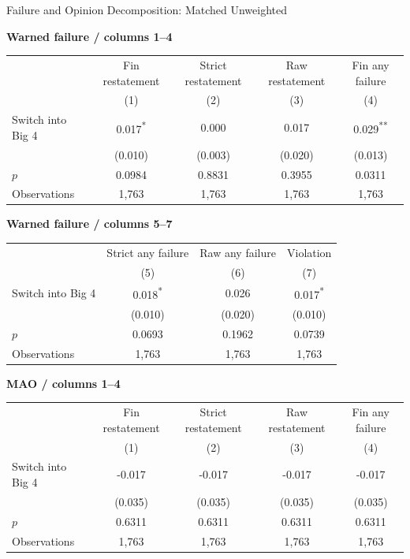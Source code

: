 \documentclass[10pt]{article}
\newcommand{\sym}[1]{\textsuperscript{#1}}
\begin{document}
\fontsize{10}{12}\selectfont
\setlength{\tabcolsep}{3pt}\renewcommand{\arraystretch}{1.15}
\begin{center}\large Failure and Opinion Decomposition: Matched Unweighted\end{center}
\medskip\textbf{Warned failure / columns 1--4}\par\smallskip
\begin{tabular*}{\textwidth}{@{\extracolsep{\fill}}lcccc@{}}
\toprule
 & Fin restatement & Strict restatement & Raw restatement & Fin any failure \\
 & (1) & (2) & (3) & (4) \\
\midrule
Switch into Big 4 & 0.017\sym{*} & 0.000 & 0.017 & 0.029\sym{**} \\
 & (0.010) & (0.003) & (0.020) & (0.013) \\
$p$ & 0.0984 & 0.8831 & 0.3955 & 0.0311 \\
Observations & 1,763 & 1,763 & 1,763 & 1,763 \\
\bottomrule\end{tabular*}\par
\medskip\textbf{Warned failure / columns 5--7}\par\smallskip
\begin{tabular*}{\textwidth}{@{\extracolsep{\fill}}lccc@{}}
\toprule
 & Strict any failure & Raw any failure & Violation \\
 & (5) & (6) & (7) \\
\midrule
Switch into Big 4 & 0.018\sym{*} & 0.026 & 0.017\sym{*} \\
 & (0.010) & (0.020) & (0.010) \\
$p$ & 0.0693 & 0.1962 & 0.0739 \\
Observations & 1,763 & 1,763 & 1,763 \\
\bottomrule\end{tabular*}\par
\medskip\textbf{MAO / columns 1--4}\par\smallskip
\begin{tabular*}{\textwidth}{@{\extracolsep{\fill}}lcccc@{}}
\toprule
 & Fin restatement & Strict restatement & Raw restatement & Fin any failure \\
 & (1) & (2) & (3) & (4) \\
\midrule
Switch into Big 4 & -0.017 & -0.017 & -0.017 & -0.017 \\
 & (0.035) & (0.035) & (0.035) & (0.035) \\
$p$ & 0.6311 & 0.6311 & 0.6311 & 0.6311 \\
Observations & 1,763 & 1,763 & 1,763 & 1,763 \\
\bottomrule\end{tabular*}\par
\end{document}

